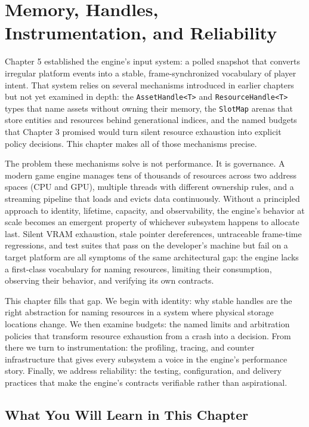 \documentclass[
  11pt,
  letterpaper,
  DIV=11,
  numbers=noendperiod,
  twoside,
  open=right]{scrreprt}
\begin{document}
\chapter{Memory, Handles, Instrumentation, and
Reliability}\label{memory-handles-instrumentation-and-reliability}

Chapter 5 established the engine's input system: a polled snapshot that
converts irregular platform events into a stable, frame-synchronized
vocabulary of player intent. That system relies on several mechanisms
introduced in earlier chapters but not yet examined in depth: the
\texttt{AssetHandle\textless{}T\textgreater{}} and
\texttt{ResourceHandle\textless{}T\textgreater{}} types that name assets
without owning their memory, the \texttt{SlotMap} arenas that store
entities and resources behind generational indices, and the named
budgets that Chapter 3 promised would turn silent resource exhaustion
into explicit policy decisions. This chapter makes all of those
mechanisms precise.

The problem these mechanisms solve is not performance. It is governance.
A modern game engine manages tens of thousands of resources across two
address spaces (CPU and GPU), multiple threads with different ownership
rules, and a streaming pipeline that loads and evicts data continuously.
Without a principled approach to identity, lifetime, capacity, and
observability, the engine's behavior at scale becomes an emergent
property of whichever subsystem happens to allocate last. Silent VRAM
exhaustion, stale pointer dereferences, untraceable frame-time
regressions, and test suites that pass on the developer's machine but
fail on a target platform are all symptoms of the same architectural
gap: the engine lacks a first-class vocabulary for naming resources,
limiting their consumption, observing their behavior, and verifying its
own contracts.

This chapter fills that gap. We begin with identity: why stable handles
are the right abstraction for naming resources in a system where
physical storage locations change. We then examine budgets: the named
limits and arbitration policies that transform resource exhaustion from
a crash into a decision. From there we turn to instrumentation: the
profiling, tracing, and counter infrastructure that gives every
subsystem a voice in the engine's performance story. Finally, we address
reliability: the testing, configuration, and delivery practices that
make the engine's contracts verifiable rather than aspirational.

\section*{What You Will Learn in This
Chapter}\label{what-you-will-learn-in-this-chapter-5}
\end{document}
